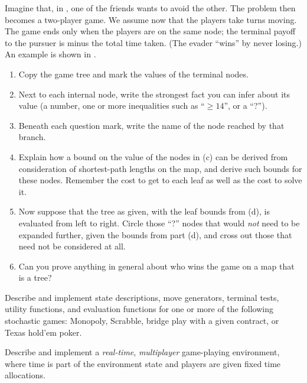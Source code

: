 \begin{exercise}%
Imagine that, in , one of the friends
wants to avoid the other. The problem then becomes a two-player
 game. We
assume now that the players take turns moving.  The game ends only
when the players are on the same node; the terminal payoff to the
pursuer is minus the total time taken. (The evader ``wins'' by never
losing.)  An example is shown in .
\begin{enumerate}
\item Copy the game tree and mark the values of the terminal nodes.
\item Next to each internal node, write the strongest fact you can infer about its value (a number, one or more inequalities such as ``\(\geq 14\)'', or a ``?'').
\item Beneath each question mark, write the name of the node reached by that branch.
\item Explain how a bound on the value of the nodes in (c) can be derived from consideration of shortest-path lengths on the map, and derive such bounds for these nodes.
Remember the cost to get to each leaf as well as the cost to solve it.
\item Now suppose that the tree as given, with the leaf bounds from (d), is evaluated from left to right.
Circle those ``?'' nodes that would {\em not} need to be expanded further, given the bounds from part (d), and cross out those that need not be
considered at all.
\item Can you prove anything in general about who wins the game on a map that is a tree?
\end{enumerate}
\end{exercise} 

\begin{exercise}%
Describe and implement state descriptions, move generators, terminal
tests, utility functions, and evaluation functions for one or more of
the following stochastic games: Monopoly, Scrabble, bridge play with a given contract, or Texas hold'em poker.
\end{exercise} 

\begin{exercise}\prgex%
Describe and implement a {\em real-time}, {\em multiplayer} game-playing
environment, where time is part of the environment state and players are given fixed time allocations.
\end{exercise} 

